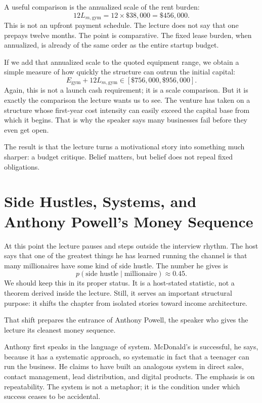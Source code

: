 A useful comparison is the annualized scale of the rent burden:
\begin{equation}
12L_{m,\mathrm{gym}} = 12 \times \$38{,}000 = \$456{,}000.
\end{equation}
This is not an upfront payment schedule. The lecture does not say that one prepays twelve months. The point is comparative. The fixed lease burden, when annualized, is already of the same order as the entire startup budget.

If we add that annualized scale to the quoted equipment range, we obtain a simple measure of how quickly the structure can outrun the initial capital:
\begin{equation}
E_{\mathrm{gym}} + 12L_{m,\mathrm{gym}} \in [\$756{,}000,\$956{,}000].
\end{equation}
Again, this is not a launch cash requirement; it is a scale comparison. But it is exactly the comparison the lecture wants us to see. The venture has taken on a structure whose first-year cost intensity can easily exceed the capital base from which it begins. That is why the speaker says many businesses fail before they even get open.

The result is that the lecture turns a motivational story into something much sharper: a budget critique. Belief matters, but belief does not repeal fixed obligations.

\section{Side Hustles, Systems, and Anthony Powell's Money Sequence}

At this point the lecture pauses and steps outside the interview rhythm. The host says that one of the greatest things he has learned running the channel is that many millionaires have some kind of side hustle. The number he gives is
\begin{equation}
p(\text{side hustle}\mid \text{millionaire}) \approx 0.45.
\end{equation}
We should keep this in its proper status. It is a host-stated statistic, not a theorem derived inside the lecture. Still, it serves an important structural purpose: it shifts the chapter from isolated stories toward income architecture.

That shift prepares the entrance of Anthony Powell, the speaker who gives the lecture its cleanest money sequence.

Anthony first speaks in the language of system. McDonald's is successful, he says, because it has a systematic approach, so systematic in fact that a teenager can run the business. He claims to have built an analogous system in direct sales, contact management, lead distribution, and digital products. The emphasis is on repeatability. The system is not a metaphor; it is the condition under which success ceases to be accidental.

